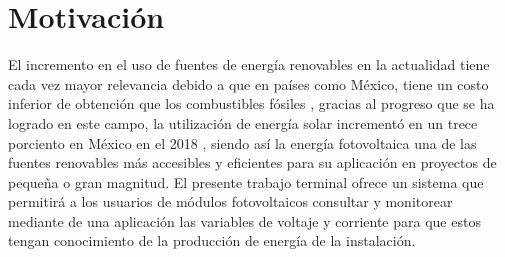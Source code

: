 \section{Motivación}
El incremento en el uso de fuentes de energía renovables en la actualidad tiene cada vez mayor relevancia debido a que en países como México, tiene un costo inferior de obtención que los combustibles fósiles \citep{Not1}, gracias al progreso que se ha logrado en este campo, la utilización de energía solar incrementó en un trece porciento en México en el 2018 \citep{Not2}, siendo así la energía fotovoltaica una de las fuentes renovables más accesibles y eficientes para su aplicación en proyectos de pequeña o gran magnitud.
El presente trabajo terminal ofrece un sistema que permitirá a los usuarios de módulos fotovoltaicos consultar y monitorear mediante de una aplicación las variables de voltaje y corriente para que estos tengan conocimiento de la producción de energía de la instalación.
